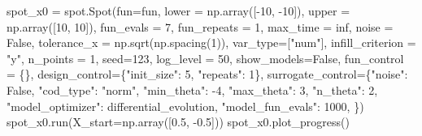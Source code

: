 \documentclass[
  letterpaper,
  DIV=11,
  numbers=noendperiod]{scrreprt}
\newenvironment{Shaded}{\begin{snugshade}}{\end{snugshade}}
\newcommand{\DecValTok}[1]{\textcolor[rgb]{0.68,0.00,0.00}{#1}}
\newcommand{\FloatTok}[1]{\textcolor[rgb]{0.68,0.00,0.00}{#1}}
\newcommand{\NormalTok}[1]{\textcolor[rgb]{0.00,0.23,0.31}{#1}}
\newcommand{\OperatorTok}[1]{\textcolor[rgb]{0.37,0.37,0.37}{#1}}
\newcommand{\StringTok}[1]{\textcolor[rgb]{0.13,0.47,0.30}{#1}}
\newcommand{\VariableTok}[1]{\textcolor[rgb]{0.07,0.07,0.07}{#1}}
\begin{document}
\begin{Shaded}
\begin{Highlighting}[]
\NormalTok{spot\_x0 }\OperatorTok{=}\NormalTok{ spot.Spot(fun}\OperatorTok{=}\NormalTok{fun,}
\NormalTok{                   lower }\OperatorTok{=}\NormalTok{ np.array([}\OperatorTok{{-}}\DecValTok{10}\NormalTok{, }\OperatorTok{{-}}\DecValTok{10}\NormalTok{]),}
\NormalTok{                   upper }\OperatorTok{=}\NormalTok{ np.array([}\DecValTok{10}\NormalTok{, }\DecValTok{10}\NormalTok{]),}
\NormalTok{                   fun\_evals }\OperatorTok{=} \DecValTok{7}\NormalTok{,}
\NormalTok{                   fun\_repeats }\OperatorTok{=} \DecValTok{1}\NormalTok{,}
\NormalTok{                   max\_time }\OperatorTok{=}\NormalTok{ inf,}
\NormalTok{                   noise }\OperatorTok{=} \VariableTok{False}\NormalTok{,}
\NormalTok{                   tolerance\_x }\OperatorTok{=}\NormalTok{ np.sqrt(np.spacing(}\DecValTok{1}\NormalTok{)),}
\NormalTok{                   var\_type}\OperatorTok{=}\NormalTok{[}\StringTok{"num"}\NormalTok{],}
\NormalTok{                   infill\_criterion }\OperatorTok{=} \StringTok{"y"}\NormalTok{,}
\NormalTok{                   n\_points }\OperatorTok{=} \DecValTok{1}\NormalTok{,}
\NormalTok{                   seed}\OperatorTok{=}\DecValTok{123}\NormalTok{,}
\NormalTok{                   log\_level }\OperatorTok{=} \DecValTok{50}\NormalTok{,}
\NormalTok{                   show\_models}\OperatorTok{=}\VariableTok{False}\NormalTok{,}
\NormalTok{                   fun\_control }\OperatorTok{=}\NormalTok{ \{\},}
\NormalTok{                   design\_control}\OperatorTok{=}\NormalTok{\{}\StringTok{"init\_size"}\NormalTok{: }\DecValTok{5}\NormalTok{,}
                                   \StringTok{"repeats"}\NormalTok{: }\DecValTok{1}\NormalTok{\},}
\NormalTok{                   surrogate\_control}\OperatorTok{=}\NormalTok{\{}\StringTok{"noise"}\NormalTok{: }\VariableTok{False}\NormalTok{,}
                                      \StringTok{"cod\_type"}\NormalTok{: }\StringTok{"norm"}\NormalTok{,}
                                      \StringTok{"min\_theta"}\NormalTok{: }\OperatorTok{{-}}\DecValTok{4}\NormalTok{,}
                                      \StringTok{"max\_theta"}\NormalTok{: }\DecValTok{3}\NormalTok{,}
                                      \StringTok{"n\_theta"}\NormalTok{: }\DecValTok{2}\NormalTok{,}
                                      \StringTok{"model\_optimizer"}\NormalTok{: differential\_evolution,}
                                      \StringTok{"model\_fun\_evals"}\NormalTok{: }\DecValTok{1000}\NormalTok{,}
\NormalTok{                                      \})}
\NormalTok{spot\_x0.run(X\_start}\OperatorTok{=}\NormalTok{np.array([}\FloatTok{0.5}\NormalTok{, }\OperatorTok{{-}}\FloatTok{0.5}\NormalTok{]))}
\NormalTok{spot\_x0.plot\_progress()}
\end{Highlighting}
\end{Shaded}
\end{document}
